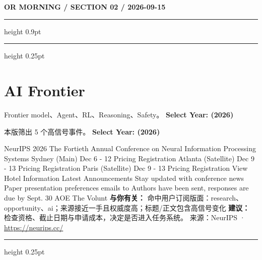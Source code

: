 \documentclass[10.5pt]{ctexart}
\begin{document}
\newpage
{\small\bfseries OR MORNING / SECTION 02 / 2026-09-15}
\vspace{2mm}
\hrule height 0.9pt
\vspace{1.5mm}
\hrule height 0.25pt
\vspace{4mm}
\section*{AI Frontier}
{\color{ormuted} Frontier model、Agent、RL、Reasoning、Safety。}
\vspace{2mm}
{\LARGE\bfseries Select Year: (2026)}\par
\vspace{1mm}
{\color{ormuted} 本版筛出 5 个高信号事件。}
\vspace{3mm}
{\Large\bfseries Select Year: (2026)}\par
NeurIPS 2026 The Fortieth Annual Conference on Neural Information Processing Systems Sydney (Main) Dec 6 - 12 Pricing Registration Atlanta (Satellite) Dec 9 - 13 Pricing Registration Paris (Satellite) Dec 9 - 13 Pricing Registration View Hotel Information Latest Announcements Stay updated with conference news Paper presentation preferences emails to Authors have been sent, responses are due by Sept. 30 AOE The Volunt
\textbf{与你有关：} 命中用户订阅版面：research、opportunity、ai；来源接近一手且权威度高；标题/正文包含高信号变化
\textbf{建议：} 检查资格、截止日期与申请成本，决定是否进入任务系统。
{\footnotesize\color{ormuted} 来源：NeurIPS · \url{https://neurips.cc/}}
\vspace{4mm}
\hrule height 0.25pt
\vspace{3mm}
\end{document}
